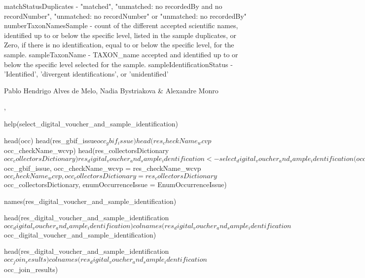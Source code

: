 \documentclass[a4paper]{book}
\begin{document}
%
\begin{Value}
matchStatusDuplicates - "matched", "unmatched: no recordedBy and no recordNumber", "unmatched: no recordNumber" or "unmatched: no recordedBy"
numberTaxonNamesSample -  count of the different accepted scientific names, identified up to or below the specific level, listed in the sample duplicates, or Zero, if there is no identification, equal to or below the specific level, for the sample.
sampleTaxonName - TAXON\_name accepted and identified up to or below the specific level selected for the sample.
sampleIdentificationStatus - 'Identified', 'divergent identifications', or 'unidentified'
\end{Value}
%
\begin{Author}
Pablo Hendrigo Alves de Melo,
Nadia Bystriakova \&
Alexandre Monro
\end{Author}
%
\begin{SeeAlso}
, 
\end{SeeAlso}
%
\begin{Examples}
\begin{ExampleCode}

help(select_digital_voucher_and_sample_identification)

head(occ)
head(res_gbif_issue$occ_gbif_issue)
head(res_checkName_wcvp$occ_checkName_wcvp)
head(res_collectorsDictionary$occ_collectorsDictionary)
res_digital_voucher_and_sample_identification <- select_digital_voucher_and_sample_identification(occ = occ,
                                                                                                  occ_gbif_issue = res_gbif_issue$occ_gbif_issue,
                                                                                                  occ_checkName_wcvp = res_checkName_wcvp$occ_checkName_wcvp,
                                                                                                  occ_collectorsDictionary = res_collectorsDictionary$occ_collectorsDictionary,
                                                                                                  enumOccurrenceIssue = EnumOccurrenceIssue)

names(res_digital_voucher_and_sample_identification)

head(res_digital_voucher_and_sample_identification$occ_digital_voucher_and_sample_identification)
colnames(res_digital_voucher_and_sample_identification$occ_digital_voucher_and_sample_identification)

head(res_digital_voucher_and_sample_identification$occ_join_results)
colnames(res_digital_voucher_and_sample_identification$occ_join_results)

\end{ExampleCode}
\end{Examples}
\end{document}
